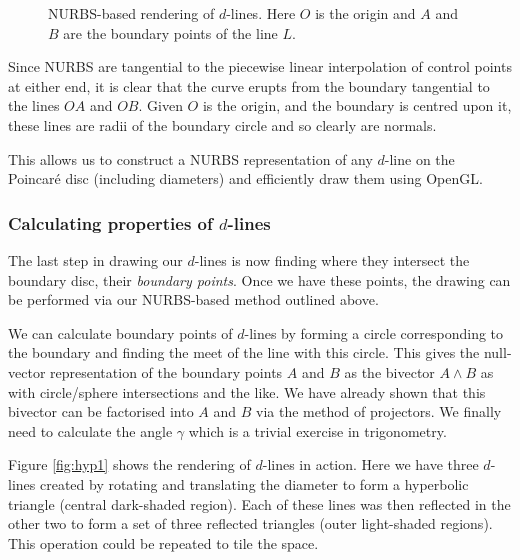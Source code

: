 \begin{figure} \centering
{}
\caption{NURBS-based rendering of $d$-lines. Here $O$ is the origin and
$A$ and $B$ are the boundary points of the line $L$.}
\label{fig:nurbs}
\end{figure}

Since NURBS are tangential to the piecewise linear interpolation of control 
points
at either end, it is clear that the curve erupts from the boundary
tangential to the lines $OA$ and $OB$. Given $O$ is the origin, and the
boundary is centred upon it, these lines are radii of the boundary
circle and so clearly are normals.

This allows us to construct a NURBS representation of any $d$-line
on the Poincar\'e disc (including diameters) and efficiently draw them
using OpenGL. 

\subsubsection{Calculating properties of $d$-lines}

The last step in drawing our $d$-lines is now finding where they intersect
the boundary disc, their \emph{boundary points}. 
Once we have these points, the drawing can be performed
via our NURBS-based method outlined above.

We can calculate boundary points of $d$-lines
by forming a circle 
corresponding to the boundary and finding the 
meet of the line with this circle. This gives the null-vector
representation of the boundary points $A$ and $B$ as the
bivector $A \wedge B$ as with circle/sphere intersections and the like.
We have already shown that this bivector can be factorised into $A$ and 
$B$ via the method of projectors.
We finally need to calculate the angle $\gamma$ which is a trivial
exercise in trigonometry.

Figure
\ref{fig:hyp1} shows the rendering of $d$-lines in action.
Here we have three $d$-lines created by rotating and translating the
diameter to form a hyperbolic triangle (central dark-shaded
region). Each of these lines was then reflected in the other two to form 
a set of three reflected triangles (outer light-shaded regions). This
operation could be repeated to tile the space.

